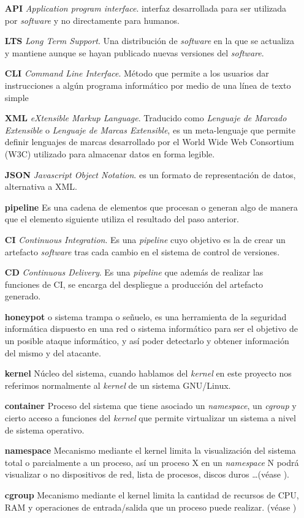 \begin{itemize}
    \item[\textbf{API}] \emph{Application program interface}. interfaz desarrollada para ser utilizada por \emph{software} y no directamente para humanos.
    \item[\textbf{LTS}] \emph{Long Term Support}. Una distribución de \emph{software} en la que se actualiza y mantiene aunque se hayan publicado nuevas versiones del \emph{software}.
    \item[\textbf{CLI}] \emph{Command Line Interface}. Método que permite a los usuarios dar instrucciones a algún programa informático por medio de una línea de texto simple
    \item[\textbf{XML}] \emph{eXtensible Markup Language}. Traducido como \emph{Lenguaje de Marcado Extensible} o \emph{Lenguaje de Marcas Extensible}, es un meta-lenguaje que permite definir lenguajes de marcas desarrollado por el World Wide Web Consortium (W3C) utilizado para almacenar datos en forma legible.
    \item[\textbf{JSON}] \emph{Javascript Object Notation}. es un formato de representación de datos, alternativa a XML.
    \item[\textbf{pipeline}] Es una cadena de elementos que procesan o generan algo de manera que el elemento siguiente utiliza el resultado del paso anterior.
    \item[\textbf{CI}] \emph{Continuous Integration}. Es una \emph{pipeline} cuyo objetivo es la de crear un artefacto \emph{software} tras cada cambio en el sistema de control de versiones.
    \item[\textbf{CD}] \emph{Continuous Delivery}. Es una \emph{pipeline} que además de realizar las funciones de CI, se encarga del despliegue a producción del artefacto generado. 
    \item[\textbf{honeypot}] o sistema trampa o señuelo, es una herramienta de la seguridad informática dispuesto en una red o sistema informático para ser el objetivo de un posible ataque informático, y así poder detectarlo y obtener información del mismo y del atacante.
    \item[\textbf{kernel}] Núcleo del sistema, cuando hablamos del \emph{kernel} en este proyecto nos referimos normalmente al \emph{kernel} de un sistema GNU/Linux. 
    \item[\textbf{container}] Proceso del sistema que tiene asociado un \emph{namespace}, un \emph{cgroup} y cierto acceso a funciones del \emph{kernel} que permite virtualizar un sistema a nivel de sistema operativo. 
    \item[\textbf{namespace}] Mecanismo mediante el kernel limita la visualización del sistema total o parcialmente a un proceso, así un proceso X en un \emph{namespace} N podrá visualizar o no
    dispositivos de red, lista de procesos, discos duros \ldots (véase \cite{wiki-namespaces}).
    \item[\textbf{cgroup}] Mecanismo mediante el kernel limita la cantidad de recursos de CPU, RAM y operaciones de entrada/salida que un proceso puede realizar. (véase \cite{wiki-cgroups})
    

\end{itemize}
